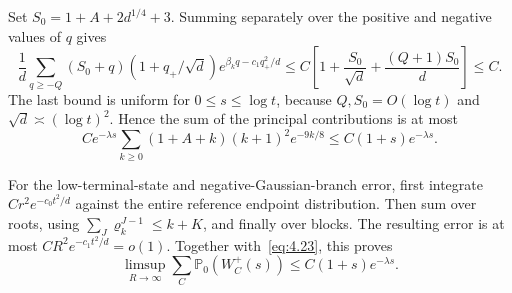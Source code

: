 \documentclass[11pt,a4paper]{article}
\numberwithin{equation}{section}
\theoremstyle{remark}
\begin{document}
Set $S_0=1+A+2d^{1/4}+3$. Summing separately over the positive and negative values of $q$ gives
\begin{equation}\label{eq:4.32}
\frac1d\sum_{q\ge-Q}(S_0+q)(1+q_+/\sqrt d)
 e^{\beta_kq-c_1q_+^2/d}
\le C\left[1+\frac{S_0}{\sqrt d}+\frac{(Q+1)S_0}{d}\right]\le C.
\end{equation}
The last bound is uniform for $0\le s\le\log t$, because $Q,S_0=O(\log t)$ and $\sqrt d\asymp(\log t)^2$. Hence the sum of the principal contributions is at most
\begin{equation}\label{eq:4.33}
Ce^{-\lambda s}\sum_{k\ge0}(1+A+k)(k+1)^2e^{-9k/8}
\le C(1+s)e^{-\lambda s}.
\end{equation}

For the low-terminal-state and negative-Gaussian-branch error, first integrate $Cr^2e^{-c_0t^2/d}$ against the entire reference endpoint distribution. Then sum over roots, using $\sum_J\varrho_k^{J-1}\le k+K$, and finally over blocks. The resulting error is at most $CR^2e^{-c_1t^2/d}=o(1)$. Together with~\eqref{eq:4.23}, this proves
\begin{equation}\label{eq:4.34}
\limsup_{R\to\infty}\sum_C\mathbb P_0(W_C^+(s))
\le C(1+s)e^{-\lambda s}.
\end{equation}
\end{document}
